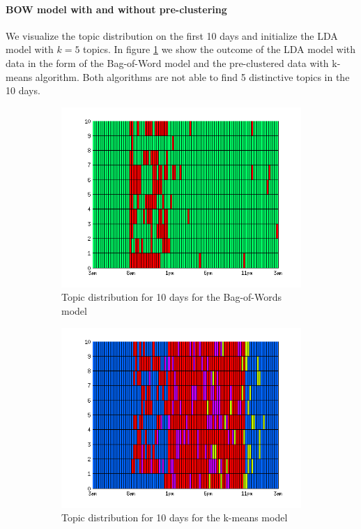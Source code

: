 \documentclass[a4paper,fleqn]{article}
\begin{document}
\paragraph{BOW model with and without pre-clustering}
We visualize the topic distribution on the first 10 days and initialize the LDA model with $k=5$ topics. In figure \ref{fig:bow/kMeans} we show the outcome of the LDA model with data in the form of the Bag-of-Word model and the pre-clustered data with k-means algorithm. Both algorithms are not able to find 5 distinctive topics in the 10 days.\\

\begin{figure}[h!]
 \centering
 \begin{subfigure}[b]{0.45\linewidth}
  \centering
  \includegraphics[width=\textwidth]{Pictures/DayTopicsTs96k5bow.png}
  \caption{Topic distribution for 10 days for the Bag-of-Words model}
 \end{subfigure}
 \begin{subfigure}[b]{0.45\linewidth}
  \centering
  \includegraphics[width=\textwidth]{Pictures/DayTopicsTs96k5Clus.png}
  \caption{Topic distribution for 10 days for the k-means model}
 \end{subfigure}
 \caption{}
 \label{fig:bow/kMeans}
\end{figure}
\end{document}
